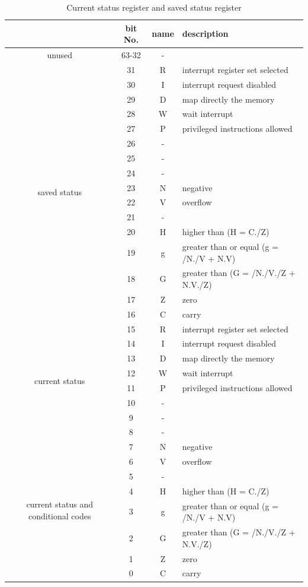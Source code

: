 \documentclass[11pt]{article}
\begin{document}
\begin{table}[h!]
    \begin{center}
        \caption{Current status register and saved status register}
        \label{tab:status}
        \begin{tabular}{|c|c|c|l|}
            \hline
            & bit No. & name & description \\
            \hline
            unused & 63-32 & - & \\
            \hline
            \multirow{16}{*}{saved status} & 31 & R & interrupt register set selected \\
            & 30 &I& interrupt request disabled \\
            & 29 &D& map directly the memory\\
            & 28 &W& wait interrupt \\
            & 27 &P&privileged instructions allowed \\
            & 26 &-& \\
            & 25 &-& \\
            & 24 &-& \\
            & 23 &N&negative \\
            & 22 &V&overflow \\
            & 21 &-& \\
            & 20 &H&higher than (H = C./Z) \\
            & 19 &g&greater than or equal (g = /N./V + N.V) \\
            & 18 &G&greater than (G = /N./V./Z + N.V./Z) \\
            & 17 &Z&zero \\
            & 16 &C&carry \\
            \hline
            \multirow{8}{*}{current status}& 15 &R& interrupt register set selected \\
            & 14 &I& interrupt request disabled \\
            & 13 &D& map directly the memory\\
            & 12 &W& wait interrupt \\
            & 11 &P&privileged instructions allowed \\
            & 10 &-& \\
            & 9 &-& \\
            & 8 &-& \\
            \hline
            \multirow{8}{*}{current status and conditional codes} & 7 &N&negative \\
            & 6 &V&overflow \\
            & 5 &-& \\
            & 4 &H&higher than (H = C./Z) \\
            & 3 &g&greater than or equal (g = /N./V + N.V) \\
            & 2 &G&greater than (G = /N./V./Z + N.V./Z) \\
            & 1 &Z&zero \\
            & 0 &C&carry \\
            \hline
        \end{tabular}
    \end{center}
\end{table}
\end{document}
